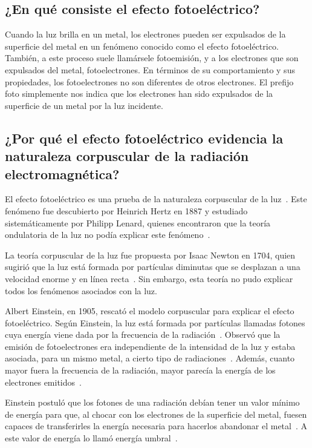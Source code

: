 \documentclass[twocolumn, 12pt]{article}
\begin{document}
\subsection*{¿En qué consiste el efecto fotoeléctrico?~\cite{cite_3}}

Cuando la luz brilla en un metal, los electrones pueden ser
expulsados de la superficie del metal en un fenómeno
conocido como el efecto fotoeléctrico. También, a este
proceso suele llamársele fotoemisión, y a los electrones
que son expulsados del metal, fotoelectrones. En términos
de su comportamiento y sus propiedades, los fotoelectrones
no son diferentes de otros electrones. El prefijo foto
simplemente nos indica que los electrones han sido
expulsados de la superficie de un metal por la luz
incidente.

\subsection*{¿Por qué el efecto fotoeléctrico evidencia la naturaleza corpuscular de la radiación
      electromagnética?}

El efecto fotoeléctrico es una prueba de la naturaleza
corpuscular de la luz~\cite{cite_1}. Este fenómeno fue
descubierto por Heinrich Hertz en 1887 y estudiado
sistemáticamente por Philipp Lenard, quienes encontraron
que la teoría ondulatoria de la luz no podía explicar este
fenómeno~\cite{cite_2}.

La teoría corpuscular de la luz fue propuesta por Isaac
Newton en 1704, quien sugirió que la luz está formada por
partículas diminutas que se desplazan a una velocidad
enorme y en línea recta~\cite{cite_2}. Sin embargo, esta
teoría no pudo explicar todos los fenómenos asociados con
la luz.

Albert Einstein, en 1905, rescató el modelo corpuscular
para explicar el efecto fotoeléctrico. Según Einstein, la
luz está formada por partículas llamadas fotones cuya
energía viene dada por la frecuencia de la
radiación~\cite{cite_2}. Observó que la emisión de
fotoelectrones era independiente de la intensidad de la luz
y estaba asociada, para un mismo metal, a cierto tipo de
radiaciones~\cite{cite_2}. Además, cuanto mayor fuera la
frecuencia de la radiación, mayor parecía la energía de los
electrones emitidos~\cite{cite_2}.

Einstein postuló que los fotones de una radiación debían
tener un valor mínimo de energía para que, al chocar con
los electrones de la superficie del metal, fuesen capaces
de transferirles la energía necesaria para hacerlos
abandonar el metal~\cite{cite_2}. A este valor de energía
lo llamó energía umbral~\cite{cite_2}.
\end{document}
